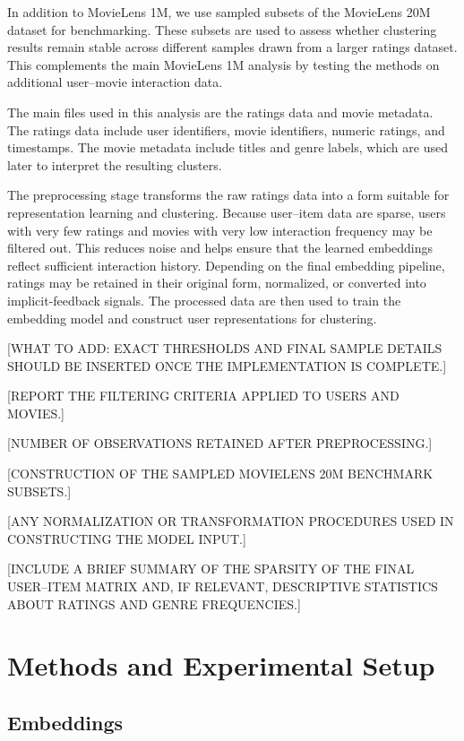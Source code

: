\documentclass[
  11pt,
]{article}
\begin{document}
In addition to MovieLens 1M, we use sampled subsets of the MovieLens 20M
dataset for benchmarking. These subsets are used to assess whether
clustering results remain stable across different samples drawn from a
larger ratings dataset. This complements the main MovieLens 1M analysis
by testing the methods on additional user--movie interaction data.

The main files used in this analysis are the ratings data and movie
metadata. The ratings data include user identifiers, movie identifiers,
numeric ratings, and timestamps. The movie metadata include titles and
genre labels, which are used later to interpret the resulting clusters.

The preprocessing stage transforms the raw ratings data into a form
suitable for representation learning and clustering. Because user--item
data are sparse, users with very few ratings and movies with very low
interaction frequency may be filtered out. This reduces noise and helps
ensure that the learned embeddings reflect sufficient interaction
history. Depending on the final embedding pipeline, ratings may be
retained in their original form, normalized, or converted into
implicit-feedback signals. The processed data are then used to train the
embedding model and construct user representations for clustering.

{[}WHAT TO ADD: EXACT THRESHOLDS AND FINAL SAMPLE DETAILS SHOULD BE
INSERTED ONCE THE IMPLEMENTATION IS COMPLETE.{]}

{[}REPORT THE FILTERING CRITERIA APPLIED TO USERS AND MOVIES.{]}

{[}NUMBER OF OBSERVATIONS RETAINED AFTER PREPROCESSING.{]}

{[}CONSTRUCTION OF THE SAMPLED MOVIELENS 20M BENCHMARK SUBSETS.{]}

{[}ANY NORMALIZATION OR TRANSFORMATION PROCEDURES USED IN CONSTRUCTING
THE MODEL INPUT.{]}

{[}INCLUDE A BRIEF SUMMARY OF THE SPARSITY OF THE FINAL USER--ITEM
MATRIX AND, IF RELEVANT, DESCRIPTIVE STATISTICS ABOUT RATINGS AND GENRE
FREQUENCIES.{]}

\section{Methods and Experimental
Setup}\label{methods-and-experimental-setup}

\subsection{Embeddings}\label{embeddings}
\end{document}
